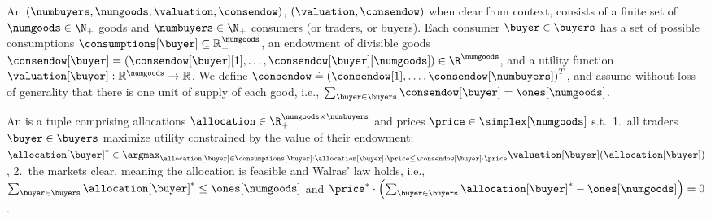 An  $(\numbuyers, \numgoods, \valuation, \consendow)$,  $(\valuation, \consendow)$ when clear from context, consists of a finite set of $\numgoods \in \N_+$ goods and $\numbuyers \in \N_+$ consumers (or traders, or buyers).
Each consumer $\buyer \in \buyers$ has a set of possible consumptions $\consumptions[\buyer] \subseteq \mathbb{R}^{\numgoods}_+$, an endowment of divisible goods $\consendow[\buyer] = \left(\consendow[\buyer][1], \dots, \consendow[\buyer][\numgoods] \right) \in \R^\numgoods$, and a utility function $\valuation[\buyer]: \mathbb{R}^{\numgoods } \to \mathbb{R}$.
We define $\consendow \doteq \left(\consendow[1], \hdots, \consendow[\numbuyers] \right)^T$, and assume without loss of generality that there is one unit of supply of each good, i.e., $\sum_{\buyer \in \buyers} \consendow[\buyer] = \ones[\numgoods]$. 


An  is a tuple comprising allocations $\allocation \in \R_+^{\numgoods \times \numbuyers}$ and prices $\price \in \simplex[\numgoods]$ s.t.\ 1.~all traders $\buyer \in \buyers$ maximize utility constrained by the value of their endowment: $\allocation[\buyer]^* \in \argmax_{\allocation[\buyer] \in \consumptions[\buyer]: \allocation[\buyer] \cdot \price \leq \consendow[\buyer] \cdot \price} \valuation[\buyer](\allocation[\buyer])$, 2.~the markets clear, meaning 
the allocation is feasible and Walras' law holds, i.e., $\sum_{\buyer \in \buyers} \allocation[\buyer]^*  \leq \ones[\numgoods]$ and $\price^* \cdot \left( \sum_{\buyer \in \buyers} \allocation[\buyer]^*  - \ones[\numgoods] \right) = 0$.

